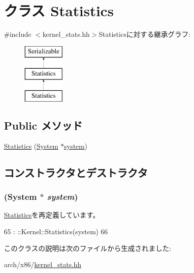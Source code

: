 \hypertarget{classX86ISA_1_1Kernel_1_1Statistics}{
\section{クラス Statistics}
\label{classX86ISA_1_1Kernel_1_1Statistics}
}


{\ttfamily \#include $<$kernel\_\-stats.hh$>$}Statisticsに対する継承グラフ:\begin{figure}[H]
\begin{center}
\leavevmode
\includegraphics[height=3cm]{classX86ISA_1_1Kernel_1_1Statistics}
\end{center}
\end{figure}
\subsection*{Public メソッド}
\begin{DoxyCompactItemize}
\item 
\hyperlink{classX86ISA_1_1Kernel_1_1Statistics_a83aac6d65afe578fbf92b926ce7c1c3c}{Statistics} (\hyperlink{classSystem}{System} $\ast$\hyperlink{namespaceX86ISA_a400778a664a4822401bb6677e1cef9c3}{system})
\end{DoxyCompactItemize}


\subsection{コンストラクタとデストラクタ}
\hypertarget{classX86ISA_1_1Kernel_1_1Statistics_a83aac6d65afe578fbf92b926ce7c1c3c}{
\subsubsection[{Statistics}]{ ({\bf System} $\ast$ {\em system})}}
\label{classX86ISA_1_1Kernel_1_1Statistics_a83aac6d65afe578fbf92b926ce7c1c3c}


\hyperlink{classKernel_1_1Statistics_a83aac6d65afe578fbf92b926ce7c1c3c}{Statistics}を再定義しています。


\begin{DoxyCode}
65                                 : ::Kernel::Statistics(system)
66     {}
\end{DoxyCode}


このクラスの説明は次のファイルから生成されました:\begin{DoxyCompactItemize}
\item 
arch/x86/\hyperlink{arch_2x86_2kernel__stats_8hh}{kernel\_\-stats.hh}\end{DoxyCompactItemize}
